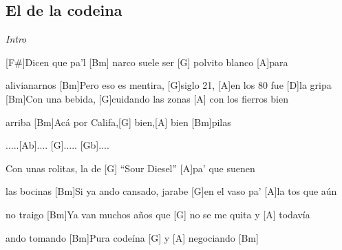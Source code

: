\subsection{El de la codeina}

\noindent
\vspace{1cm}

\begin{guitar}
	\begin{multicols}{2}

		\textit{Intro}

		[F#]Dicen que pa'l [Bm] narco suele ser [G] polvito blanco [A]para \par [D] alivianarnos
		[Bm]Pero eso es mentira, [G]siglo 21, [A]en los 80 fue [D]la gripa
		[Bm]Con una bebida, [G]cuidando las zonas [A] con los fierros bien \par [D]arriba
		[Bm]Ac\'a por Califa,[G] bien,[A] bien [Bm]pilas
		\par
		[A].....[Ab].... [G]..... [Gb].... \par
		[Bm]Con unas rolitas, la de [G] ``Sour Diesel'' [A]pa' que suenen \par [D]  las bocinas
		[Bm]Si ya ando cansado, jarabe [G]en el vaso pa' [A]la tos que aún \par [D] no traigo
		[Bm]Ya van muchos a\~{n}os que [G] no se me quita y [A] todav\'ia \par [D] ando tomando
		[Bm]Pura code\'ina [G] y [A] negociando [Bm] \par


\end{multicols}
\end{guitar}
